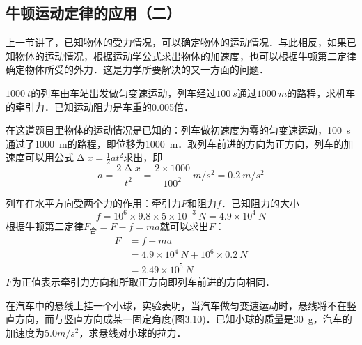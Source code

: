 \begin{Test}
\section{牛顿运动定律的应用（二）}
上一节讲了，已知物体的受力情况，可以确定物体的运动情况．与此相反，如果已知物体的运动情况，根据运动学公式求出物体的加速度，也可以根据牛顿第二定律确定物体所受的外力．这是力学所要解决的又一方面的问题．

\begin{Example}
    $\SI{1000}{t}$的列车由车站出发做匀变速运动，列车经过$\SI{100}{s}$通过$\SI{1000}{m}$的路程，求机车的牵引力．已知运动阻力是车重的0.005倍．
\end{Example}

\begin{Answer}
    在这道题目里物体的运动情况是已知的：列车做初速度为零的匀变速运动，\SI{100}{s}通过了\SI{1000}{m}的路程，即位移为\SI{1000}{m}．取列车前进的方向为正方向，列车的加速度可以用公式$\upDelta x=\frac{1}{2}at^2$求出，即
    \[a=\frac{2\upDelta x}{t^2}=\frac{2\times 1000}{100^2}~\si{m/s^2}=\SI{0.2}{m/s^2} \]

    列车在水平方向受两个力的作用：牵引力$F$和阻力$f$．已知阻力的大小
    \[f=10^6\times 9.8\times 5\times 10^{-3}~\si{N}=4.9\times 10^4 ~\si{N} \]
    根据牛顿第二定律$F_{\text{合}}=F-f=ma$就可以求出$F$：
    \[\begin{split}
            F & =f+ma                                        \\
              & =4.9\times 10^4~\si{N}+10^6\times 0.2~\si{N} \\
              & =2.49\times 10^5~\si{N}
        \end{split} \]
    $F$为正值表示牵引力方向和所取正方向即列车前进的方向相同．
\end{Answer}


\begin{Example}
    在汽车中的悬线上挂一个小球，实验表明，当汽车做匀变速运动时，悬线将不在竖直方向，而与竖直方向成某一固定角度(图3.10)．已知小球的质量是\SI{30}{g}，汽车的加速度为5.0$\si{m/s^2}$，求悬线对小球的拉力．
\end{Example}

\begin{figure}[H]\centering
    \caption{}
\end{figure}


\end{Test}
